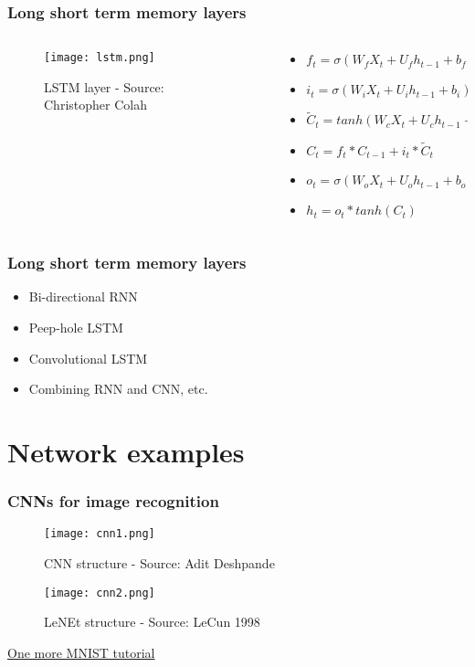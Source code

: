 \documentclass{beamer}
\begin{document}
\begin{frame}
	\frametitle{Long short term memory layers}
    \begin{columns}[T]
    \begin{column}{.5\textwidth}
    \begin{block}{}
    \begin{figure}
		\texttt{[image: lstm.png]}
		\caption{LSTM layer - Source: Christopher Colah}
	\end{figure}
    \end{block}
    \end{column}
    \begin{column}{.5\textwidth}
    \begin{block}{}
    \begin{itemize}
    	\item $f_t = \sigma(W_fX_t+U_fh_{t-1}+b_f)$
        \item $i_t = \sigma(W_iX_t+U_ih_{t-1}+b_i)$
        \item $\tilde{C}_t = tanh(W_cX_t+U_ch_{t-1}+b_c)$
        \item $C_t = f_t*C_{t-1} + i_t*\tilde{C}_t$
        \item $o_t = \sigma(W_oX_t+U_oh_{t-1}+b_o)$
        \item $h_t = o_t*tanh(C_t)$
    \end{itemize}
    \end{block}
    \end{column}
    \end{columns}
\end{frame}

\begin{frame}
	\frametitle{Long short term memory layers}
    \begin{itemize}
    	\item Bi-directional RNN
        \item Peep-hole LSTM
        \item Convolutional LSTM
        \item Combining RNN and CNN, etc.
    \end{itemize}
\end{frame}

\section{Network examples}
\begin{frame}
	\frametitle{CNNs for image recognition}
    \begin{figure}
		\texttt{[image: cnn1.png]}
		\caption{CNN structure - Source: Adit Deshpande}
	\end{figure}
    \begin{figure}
		\texttt{[image: cnn2.png]}
		\caption{LeNEt structure - Source: LeCun 1998}
	\end{figure}
    \color{blue}\href{https://www.tensorflow.org/get_started/mnist/pros}{One more MNIST tutorial}
\end{frame}
\end{document}

